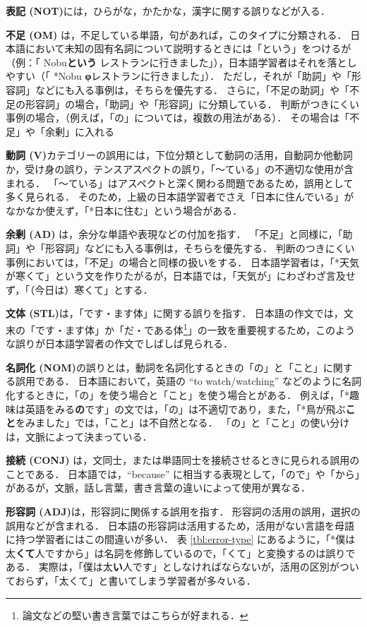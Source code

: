 \documentclass[japanese]{jnlp_1.4}
\begin{document}
 {\bf 表記 (NOT)}には，ひらがな，かたかな，漢字に関する誤りなどが入る．
 
 {\bf 不足 (OM)} は，不足している単語，句があれば，このタイプに分類される．
日本語において未知の固有名詞について説明するときには「という」をつけるが（例：「 Nobu{\bf という} レストランに行きました」），日本語学習者はそれを落としやすい（「 *Nobu {\bf φ}レストランに行きました」）．
ただし，それが「助詞」や「形容詞」などにも入る事例は，そちらを優先する．
さらに，「不足の助詞」や「不足の形容詞」の場合，「助詞」や「形容詞」に分類している．
判断がつきにくい事例の場合，（例えば，「の」については，複数の用法がある）．
その場合は「不足」や「余剰」に入れる

 {\bf 動詞 (V)}カテゴリーの誤用には，下位分類として動詞の活用，自動詞か他動詞か，受け身の誤り，テンスアスペクトの誤り，「〜ている」の不適切な使用が含まれる．
「〜ている」はアスペクトと深く関わる問題であるため，誤用として多く見られる．
そのため，上級の日本語学習者でさえ「日本に住んでいる」がなかなか使えず，「*日本に住む」という場合がある．

{\bf 余剰 (AD)}  は，余分な単語や表現などの付加を指す．
「不足」と同様に，「助詞」や「形容詞」などにも入る事例は，そちらを優先する．
判断のつきにくい事例においては，「不足」の場合と同様の扱いをする．
日本語学習者は，「*天気が寒くて」という文を作りたがるが，日本語では，「天気が」にわざわざ言及せず，「（今日は）寒くて」とする．

{\bf 文体 (STL)}は，「です・ます体」に関する誤りを指す．
日本語の作文では，文末の「です・ます体」か「だ・である体\footnote{論文などの堅い書き言葉ではこちらが好まれる．}」の一致を重要視するため，このような誤りが日本語学習者の作文でしばしば見られる．

{\bf 名詞化 (NOM)}の誤りとは，動詞を名詞化するときの「の」と「こと」に関する誤用である．
日本語において，英語の ``to watch/watching''  などのように名詞化するときに，「の」を使う場合と「こと」を使う場合とがある．
例えば，「*趣味は英語をみる{\bf の}です」の文では，「の」は不適切であり，また，「*鳥が飛ぶ{\bf こと}をみました」では，「こと」は不自然となる．
「の」と「こと」の使い分けは，文脈によって決まっている．

{\bf 接続 (CONJ)} は，文同士，または単語同士を接続させるときに見られる誤用のことである．
日本語では，``because'' に相当する表現として，「ので」や「から」があるが，文脈，話し言葉，書き言葉の違いによって使用が異なる．


{\bf 形容詞 (ADJ)}は，形容詞に関係する誤用を指す．
形容詞の活用の誤用，選択の誤用などが含まれる．
日本語の形容詞は活用するため，活用がない言語を母語に持つ学習者にはこの間違いが多い．
表 \ref{tbl:error-type} にあるように，「*僕は太{\bf くて}人ですから」は名詞を修飾しているので，「くて」と変換するのは誤りである．
実際は，「僕は太{\bf い}人です」としなければならないが，活用の区別がついておらず，「太くて」と書いてしまう学習者が多々いる．
\end{document}
